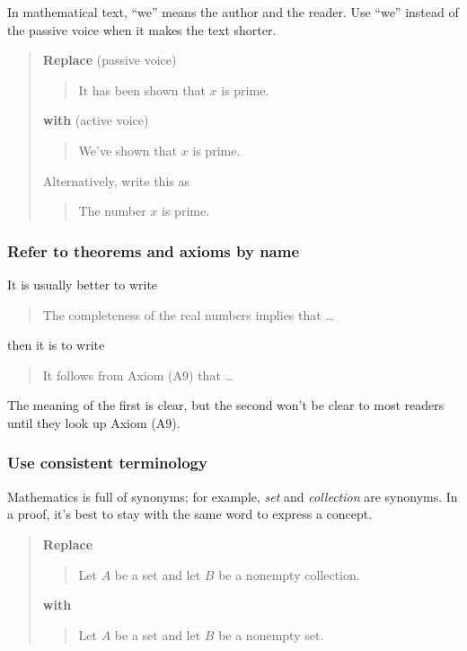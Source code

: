 \documentclass[12pt,fleqn]{article}
\newcounter{ex}\setcounter{ex}{0}
\newcounter{se}\setcounter{se}{0}
\begin{document}
In mathematical text, ``we'' means the author and the reader.
Use ``we'' instead of the passive voice when it makes the 
text shorter.

\begin{quote}
\textbf{Replace} (passive voice)
\begin{quote}
  It has been shown that \(x\) is prime.
\end{quote}
\textbf{with} (active voice)
\begin{quote}
  We've shown that \(x\) is prime.
\end{quote}
Alternatively, write this as
\begin{quote}
  The number \(x\) is prime.
\end{quote}
\end{quote}

 \subsubsection{  Refer to theorems and axioms by name}  

It is usually better to write
\begin{quote}
The completeness of the real numbers implies that \dots
\end{quote}
then it is to write
\begin{quote}
 It follows from Axiom  (A9) that \dots
\end{quote}
The meaning of the first is clear, but the second won't be clear
to most readers until they look up Axiom (A9).

 \subsubsection{  Use consistent terminology}

Mathematics is full of synonyms; for example, \emph{set} and 
\emph{collection} are synonyms. In a proof, it's best to stay with the
same word to express a concept.

\begin{quote}
\textbf{Replace}
\begin{quote}
Let \(A\) be a set and let \(B\) be a nonempty collection.
\end{quote}
\textbf{with}
\begin{quote}
Let \(A\) be a set and let \(B\) be a nonempty set.
\end{quote}
\end{quote}

\end{document}
